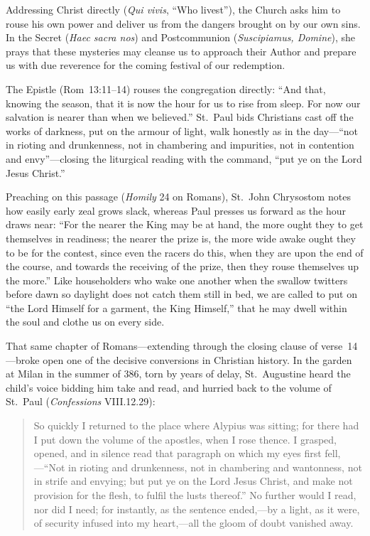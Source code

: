 Addressing Christ directly (\textit{Qui vivis}, ``Who livest''), the
Church asks him to rouse his own power and deliver us from the dangers
brought on by our own sins. In the Secret (\textit{Haec sacra nos}) and
Postcommunion (\textit{Suscipiamus, Domine}), she prays that these
mysteries may cleanse us to approach their Author and prepare us with
due reverence for the coming festival of our redemption.

The Epistle (Rom~13:11--14) rouses the congregation directly: ``And
that, knowing the season, that it is now the hour for us to rise from
sleep. For now our salvation is nearer than when we believed.'' St.~Paul
bids Christians cast off the works of darkness, put on the armour of
light, walk honestly as in the day---``not in rioting and drunkenness,
not in chambering and impurities, not in contention and envy''---closing
the liturgical reading with the command, ``put ye on the Lord Jesus
Christ.''

Preaching on this passage (\textit{Homily} 24 on Romans), St.~John
Chrysostom notes how easily early zeal grows slack, whereas Paul presses
us forward as the hour draws near: ``For the nearer the King may be at
hand, the more ought they to get themselves in readiness; the nearer the
prize is, the more wide awake ought they to be for the contest, since
even the racers do this, when they are upon the end of the course, and
towards the receiving of the prize, then they rouse themselves up the
more.'' Like householders who wake one another when the swallow twitters
before dawn so daylight does not catch them still in bed, we are called
to put on ``the Lord Himself for a garment, the King Himself,'' that he
may dwell within the soul and clothe us on every side.

That same chapter of Romans---extending through the closing clause of
verse~14---broke open one of the decisive conversions in Christian
history. In the garden at Milan in the summer of 386, torn by years of
delay, St.~Augustine heard the child's voice bidding him take and read,
and hurried back to the volume of St.~Paul (\textit{Confessions}
VIII.12.29):

\begin{quote}
So quickly I returned to the place where Alypius was sitting; for
there had I put down the volume of the apostles, when I rose thence. I
grasped, opened, and in silence read that paragraph on which my eyes
first fell,---``Not in rioting and drunkenness, not in chambering and
wantonness, not in strife and envying; but put ye on the Lord Jesus
Christ, and make not provision for the flesh, to fulfil the lusts
thereof.'' No further would I read, nor did I need; for instantly, as the
sentence ended,---by a light, as it were, of security infused into my
heart,---all the gloom of doubt vanished away.
\end{quote}

